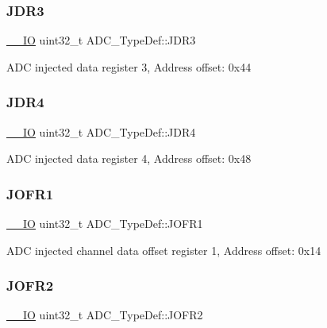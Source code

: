 \subsubsection{\texorpdfstring{J\+D\+R3}{JDR3}}
{\footnotesize\ttfamily \hyperlink{core__sc300_8h_aec43007d9998a0a0e01faede4133d6be}{\+\_\+\+\_\+\+IO} uint32\+\_\+t A\+D\+C\+\_\+\+Type\+Def\+::\+J\+D\+R3}

A\+DC injected data register 3, Address offset\+: 0x44 \mbox{\label{struct_a_d_c___type_def_abae6e9d688b16ef350878998f5e21c0b}} 
\subsubsection{\texorpdfstring{J\+D\+R4}{JDR4}}
{\footnotesize\ttfamily \hyperlink{core__sc300_8h_aec43007d9998a0a0e01faede4133d6be}{\+\_\+\+\_\+\+IO} uint32\+\_\+t A\+D\+C\+\_\+\+Type\+Def\+::\+J\+D\+R4}

A\+DC injected data register 4, Address offset\+: 0x48 \mbox{\label{struct_a_d_c___type_def_aa005e656f528aaad28d70d61c9db9b81}} 
\subsubsection{\texorpdfstring{J\+O\+F\+R1}{JOFR1}}
{\footnotesize\ttfamily \hyperlink{core__sc300_8h_aec43007d9998a0a0e01faede4133d6be}{\+\_\+\+\_\+\+IO} uint32\+\_\+t A\+D\+C\+\_\+\+Type\+Def\+::\+J\+O\+F\+R1}

A\+DC injected channel data offset register 1, Address offset\+: 0x14 \mbox{\label{struct_a_d_c___type_def_aa20f76044c11042dde41c1060853fb82}} 
\subsubsection{\texorpdfstring{J\+O\+F\+R2}{JOFR2}}
{\footnotesize\ttfamily \hyperlink{core__sc300_8h_aec43007d9998a0a0e01faede4133d6be}{\+\_\+\+\_\+\+IO} uint32\+\_\+t A\+D\+C\+\_\+\+Type\+Def\+::\+J\+O\+F\+R2}

